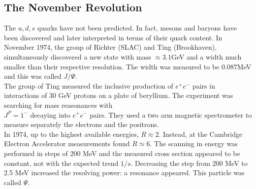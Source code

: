 \documentclass[10.75pt,a4paper,openright,bottom=2cm]{article}
\begin{document}
\subsection{The November Revolution}
The $u,d,s$ quarks have not been predicted. In fact, mesons and baryons have been discovered and later interpreted in terms of their quark content. In November 1974, the group of Richter (SLAC) and Ting (Brookhaven), simultaneously discovered a new state with mass $\approx3.1$\;GeV and a width much smaller than their respective resolution. The width was measured to be $0.087$\;MeV and this was called $J/\Psi$.\\
The group of Ting measured the inclusive production of $e^+e^-$ pairs in interactions of 30 GeV protons on a plate of beryllium. The experiment was searching for mass reasonances with\\
$J^P=1^-$  decaying into $e^+e^-$ pairs. They used a two arm magnetic spectrometer to measure separately the electrons and the positrons.\\
In 1974, up to the highest available energies, $R\approx2$. Instead, at the Cambridge Electron Accelerator measurements found $R\simeq6$. The scanning in energy was performed in steps of 200 MeV and the measured cross section appeared to be constant, not with the expected trend $1/s$. Decreasing the step from 200 MeV to 2.5 MeV increased the resolving power: a resonance appeared. This particle was called $\Psi$.
\end{document}
